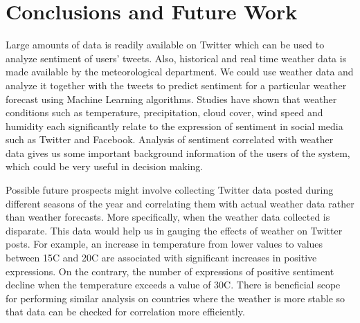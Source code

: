 \documentclass[a4paper,10pt]{article}
\begin{document}
    \section{Conclusions and Future Work}
    \label{conclusion}
     Large amounts of data is readily available on Twitter which can be used to analyze sentiment of users' tweets. Also, historical and real time weather data is made available by the meteorological department. We could use weather data and analyze it together with the tweets to predict sentiment for a particular weather forecast using Machine Learning algorithms. Studies have shown that weather conditions such as temperature, precipitation, cloud cover, wind speed and humidity each significantly relate to the expression of sentiment in social media such as Twitter and Facebook. Analysis of sentiment correlated with weather data gives us some important background information of the users of the system, which could be very useful in decision making.

     Possible future prospects might involve collecting Twitter data posted during different seasons of the year and correlating them with actual weather data rather than weather forecasts. More specifically, when the weather data collected is disparate. This data would help us in gauging the effects of weather on Twitter posts.  For example, an increase in temperature from lower values to values between 15C and 20C are associated with significant increases in positive expressions. On the contrary, the number of expressions of positive sentiment decline when the temperature exceeds a value of 30C. There is beneficial scope for performing similar analysis on countries where the weather is more stable so that data can be checked for correlation more efficiently.

    \printbibliography
\end{document}
